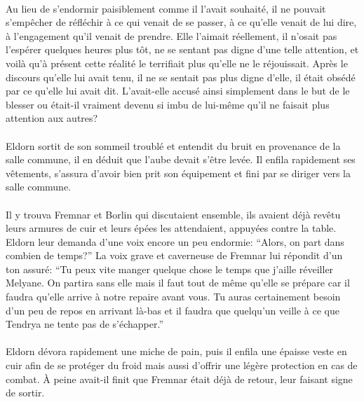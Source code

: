 \paragraph{}
Au lieu de s'endormir paisiblement comme il l'avait souhaité, il ne pouvait
s'empêcher de réfléchir à ce qui venait de se passer, à ce qu'elle venait de
lui dire, à l'engagement qu'il venait de prendre. Elle l'aimait réellement, il
n'osait pas l'espérer quelques heures plus tôt, ne se sentant pas digne d'une
telle attention, et voilà qu'à présent cette réalité le terrifiait plus
qu'elle ne le réjouissait. Après le discours qu'elle lui avait tenu, il ne
se sentait pas plus digne d'elle, il était obsédé par ce qu'elle lui avait
dit. L'avait-elle accusé ainsi simplement dans le but de le blesser ou
était-il vraiment devenu si imbu de lui-même qu'il ne faisait plus attention
aux autres?

\contextswitch

\paragraph{}
Eldorn sortit de son sommeil troublé et entendit du bruit en provenance de la
salle commune, il en déduit que l'aube devait s'être levée. Il enfila
rapidement ses vêtements, s'assura d'avoir bien prit son équipement et fini
par se diriger vers la salle commune.

\paragraph{}
Il y trouva Fremnar et Borlin qui discutaient ensemble, ils avaient déjà
revêtu leurs armures de cuir et leurs épées les attendaient, appuyées contre
la table. Eldorn leur demanda d'une voix encore un peu endormie: ``Alors, on
part dans combien de temps?'' La voix grave et caverneuse de Fremnar lui
répondit d'un ton assuré: ``Tu peux vite manger quelque chose le temps que
j'aille réveiller Melyane. On partira sans elle mais il faut tout de même
qu'elle se prépare car il faudra qu'elle arrive à notre repaire avant vous. Tu
auras certainement besoin d'un peu de repos en arrivant là-bas et il faudra
que quelqu'un veille à ce que Tendrya ne tente pas de s'échapper.''

\paragraph{}
Eldorn dévora rapidement une miche de pain, puis il enfila une épaisse veste
en cuir afin de se protéger du froid mais aussi d'offrir une légère protection
en cas de combat. À peine avait-il finit que Fremnar était déjà de retour,
leur faisant signe de sortir.

